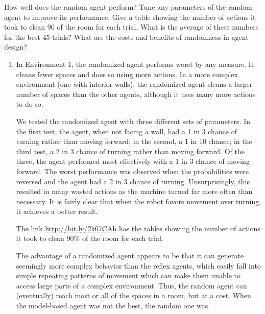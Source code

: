 \documentclass{article}
\newenvironment{Question}[2][Question]{\begin{trivlist}
\item[\hskip \labelsep {\bfseries #1}\hskip \labelsep {\bfseries #2.}]}{\end{trivlist}}
\begin{document}
\begin{Question}{4}How well does the random agent perform? Tune any parameters of the random agent to improve its performance. Give a table showing the number of actions it took to clean 90 of the room for each trial. What is the average of these numbers for the best 45 trials? What are the costs and benefits of randomness in agent design?\\
\begin{enumerate}
\item 

In Environment 1, the randomized agent performs worst by any measure. It cleans fewer spaces and does so using more actions. In a more complex environment (one with interior walls), the randomized agent cleans a larger number of spaces than the other agents, although it uses many more actions to do so. 

We tested the randomized agent with three different sets of parameters. In the first test, the agent, when not facing a wall, had a 1 in 3 chance of turning rather than moving forward; in the second, a 1 in 10 chance; in the third test, a 2 in 3 chance of turning rather than moving forward. Of the three, the agent performed most effectively with a 1 in 3 chance of moving forward. The worst performance was observed when the probabilities were reversed and the agent had a 2 in 3 chance of turning. Unsurprisingly, this resulted in many wasted actions as the machine turned far more often than necessary.  It is fairly clear that when the robot favors movement over turning, it achieves a better result.

The link \url{http://bit.ly/2k67CAh}  has the tables showing the number of actions it took to clean 90\% of the room for each trial.

The advantage of a randomized agent appears to be that it can generate seemingly more complex behavior than the reflex agents, which easily fall into simple repeating patterns of movement which can make them unable to access large parts of a complex environment. Thus, the random agent can (eventually) reach most or all of the spaces in a room, but at a cost. When the model-based agent was not the best, the random one was.
\end{enumerate}



\end{Question}
\end{document}
